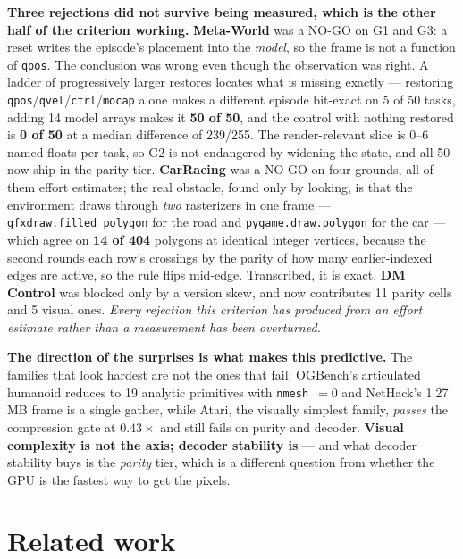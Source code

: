 \documentclass{article}
\begin{document}
\textbf{Three rejections did not survive being measured, which is the other
half of the criterion working.} \textbf{Meta-World} \citep{metaworld} was a
NO-GO on G1 and G3: a reset writes the episode's placement into the
\emph{model}, so the frame is not a function of \texttt{qpos}. The conclusion
was wrong even though the observation was right. A ladder of progressively
larger restores locates what is missing exactly --- restoring
\texttt{qpos}/\texttt{qvel}/\texttt{ctrl}/\texttt{mocap} alone makes a
different episode bit-exact on 5 of 50 tasks, adding 14 model arrays makes it
\textbf{50 of 50}, and the control with nothing restored is \textbf{0 of 50} at
a median difference of 239/255. The render-relevant slice is 0--6 named floats
per task, so G2 is not endangered by widening the state, and all 50 now ship in
the parity tier. \textbf{CarRacing} was a NO-GO on four grounds, all of them
effort estimates; the real obstacle, found only by looking, is that the
environment draws through \emph{two} rasterizers in one frame ---
\texttt{gfxdraw.filled\_polygon} for the road and \texttt{pygame.draw.polygon}
for the car --- which agree on \textbf{14 of 404} polygons at identical integer
vertices, because the second rounds each row's crossings by the parity of how
many earlier-indexed edges are active, so the rule flips mid-edge. Transcribed,
it is exact. \textbf{DM Control} was blocked only by a version skew, and now
contributes 11 parity cells and 5 visual ones. \emph{Every rejection this
criterion has produced from an effort estimate rather than a measurement has
been overturned.}

\textbf{The direction of the surprises is what makes this predictive.} The
families that look hardest are not the ones that fail: OGBench's articulated
humanoid reduces to 19 analytic primitives with \texttt{nmesh}~$=0$ and
NetHack's 1.27\,MB frame is a single gather, while Atari, the visually simplest
family, \emph{passes} the compression gate at $0.43\times$ and still fails on
purity and decoder. \textbf{Visual complexity is not the axis;
decoder stability is} --- and what decoder stability buys is the \emph{parity}
tier, which is a different question from whether the GPU is the fastest way to
get the pixels.

\section{Related work}
\end{document}
